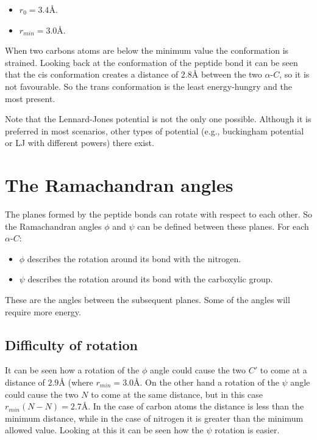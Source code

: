 	\begin{multicols}{2}
		\begin{itemize}
			\item $r_0 = 3.4\si{\angstrom}$.
			\item $r_{min} = 3.0\si{\angstrom}$.
		\end{itemize}
	\end{multicols}

	When two carbons atoms are below the minimum value the conformation is strained.
	Looking back at the conformation of the peptide bond it can be seen that the cis conformation creates a distance of $2.8\si{\angstrom}$ between the two $\alpha$-$C$, so it is not favourable.
	So the trans conformation is the least energy-hungry and the most present.

	Note that the Lennard-Jones potential is not the only one possible.
	Although it is preferred in most scenarios, other types of potential (e.g., buckingham potential or LJ with different powers) there exist.

\section{The Ramachandran angles}
The planes formed by the peptide bonds can rotate with respect to each other.
So the Ramachandran angles $\phi$ and $\psi$ can be defined between these planes.
For each $\alpha$-$C$:

\begin{multicols}{2}
	\begin{itemize}
		\item $\phi$ describes the rotation around its bond with the nitrogen.
		\item $\psi$ describes the rotation around its bond with the carboxylic group.
	\end{itemize}
\end{multicols}

These are the angles between the subsequent planes.
Some of the angles will require more energy.

	\subsection{Difficulty of rotation}
	It can be seen how a rotation of the $\phi$ angle could cause the two $C'$ to come at a distance of $2.9\si{\angstrom}$ (where $r_{min} = 3.0\si{\angstrom}$.
	On the other hand a rotation of the $\psi$ angle could cause the two $N$ to come at the same distance, but in this case $r_{min}(N-N) = 2.7\si{\angstrom}$.
	In the case of carbon atoms the distance is less than the minimum distance, while in the case of nitrogen it is greater than the minimum allowed value.
	Looking at this it can be seen how the $\psi$ rotation is easier.

